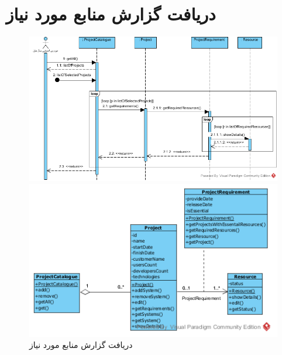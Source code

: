 \section{دریافت گزارش منابع مورد نیاز}
\begin{figure}[H]
	\centering
	\includegraphics[scale=0.55]{img/sequence-analysis/RequiredResourcesReport}
	
	
	\includegraphics[scale=0.55]{img/sequence-analysis/RequiredResourcesReportC}
	\caption{دریافت گزارش منابع مورد نیاز}
\end{figure}

